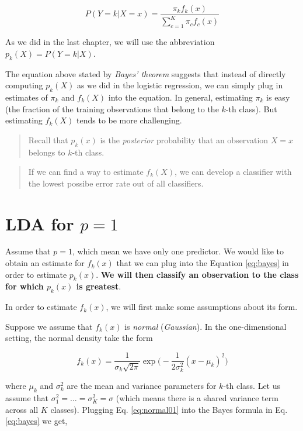 \documentclass[]{book}
\begin{document}
\begin{equation}
P(Y=k|X=x) = \frac{ \pi_k f_k(x)}{\sum_{c=1}^K \pi_c f_c(x)}
\label{eq:bayes}
\end{equation}

As we did in the last chapter, we will use the abbreviation
\(p_k(X) =P(Y = k|X)\).

The equation above stated by \emph{Bayes' theorem} suggests that instead
of directly computing \(p_k(X)\) as we did in the logistic regression,
we can simply plug in estimates of \(\pi_k\) and \(f_k(X)\) into the
equation. In general, estimating \(\pi_k\) is easy (the fraction of the
training observations that belong to the \(k\)-th class). But estimating
\(f_k(X)\) tends to be more challenging.

\begin{quote}
Recall that \(p_k(x)\) is the \emph{posterior} probability that an
observation \(X=x\) belongs to \(k\)-th class.
\end{quote}

\begin{quote}
If we can find a way to estimate \(f_k(X)\), we can develop a classifier
with the lowest possibe error rate out of all classifiers.
\end{quote}

\section{\texorpdfstring{LDA for
\(p=1\)}{LDA for p=1}}\label{lda-for-p1}

Assume that \(p=1\), which mean we have only one predictor. We would
like to obtain an estimate for \(f_k(x)\) that we can plug into the
Equation \eqref{eq:bayes} in order to estimate \(p_k(x)\). \textbf{We will
then classify an observation to the class for which \(p_k(x)\) is
greatest}.

In order to estimate \(f_k(x)\), we will first make some assumptions
about its form.

Suppose we assume that \(f_k(x)\) is \emph{normal} (\emph{Gaussian}). In
the one-dimensional setting, the normal density take the form

\begin{equation}
f_k(x)= \frac{1}{\sigma_k\sqrt{2\pi}} \exp \big( - \frac{1}{2\sigma_k^2 } (x-\mu_k)^2\big)
\label{eq:normal01}
\end{equation}

where \(\mu_k\) and \(\sigma_k^2\) are the mean and variance parameters
for \(k\)-th class. Let us assume that
\(\sigma_1^2 = \ldots = \sigma_K^2 = \sigma\) (which means there is a
shared variance term across all \(K\) classes). Plugging Eq.
\eqref{eq:normal01} into the Bayes formula in Eq. \eqref{eq:bayes} we get,
\end{document}
